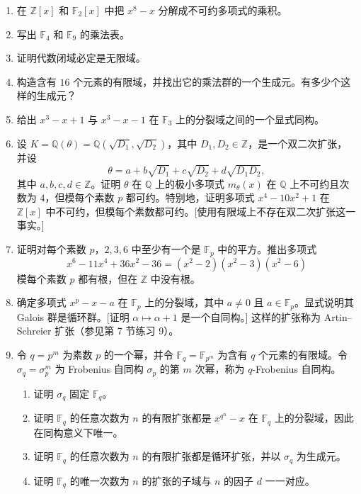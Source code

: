 \begin{enumerate}
\item 在 $\mathbb Z[x]$ 和 $\mathbb F_2[x]$ 中把 $x^8-x$ 分解成不可约多项式的乘积。

\item 写出 $\mathbb F_4$ 和 $\mathbb F_9$ 的乘法表。

\item 证明代数闭域必定是无限域。

\item 构造含有 $16$ 个元素的有限域，并找出它的乘法群的一个生成元。有多少个这样的生成元？

\item 给出 $x^3-x+1$ 与 $x^3-x-1$ 在 $\mathbb F_3$ 上的分裂域之间的一个显式同构。

\item 设 $K=\mathbb Q(\theta)=\mathbb Q(\sqrt{D_1},\sqrt{D_2})$，其中 $D_1,D_2\in\mathbb Z$，是一个双二次扩张，并设
\[
\theta=a+b\sqrt{D_1}+c\sqrt{D_2}+d\sqrt{D_1D_2},
\]
其中 $a,b,c,d\in\mathbb Z$。证明 $\theta$ 在 $\mathbb Q$ 上的极小多项式 $m_\theta(x)$ 在 $\mathbb Q$ 上不可约且次数为 $4$，但模每个素数 $p$ 都可约。特别地，证明多项式 $x^4-10x^2+1$ 在 $\mathbb Z[x]$ 中不可约，但模每个素数都可约。[使用有限域上不存在双二次扩张这一事实。]

\item 证明对每个素数 $p$，$2,3,6$ 中至少有一个是 $\mathbb F_p$ 中的平方。推出多项式
\[
x^6-11x^4+36x^2-36=(x^2-2)(x^2-3)(x^2-6)
\]
模每个素数 $p$ 都有根，但在 $\mathbb Z$ 中没有根。

\item 确定多项式 $x^p-x-a$ 在 $\mathbb F_p$ 上的分裂域，其中 $a\neq 0$ 且 $a\in\mathbb F_p$。显式说明其 Galois 群是循环群。[证明 $\alpha\mapsto \alpha+1$ 是一个自同构。] 这样的扩张称为 Artin--Schreier 扩张（参见第 7 节练习 9）。

\item 令 $q=p^m$ 为素数 $p$ 的一个幂，并令 $\mathbb F_q=\mathbb F_{p^m}$ 为含有 $q$ 个元素的有限域。令 $\sigma_q=\sigma_p^m$ 为 Frobenius 自同构 $\sigma_p$ 的第 $m$ 次幂，称为 $q$-Frobenius 自同构。
\begin{enumerate}[label=(\alph*)]
\item 证明 $\sigma_q$ 固定 $\mathbb F_q$。
\item 证明 $\mathbb F_q$ 的任意次数为 $n$ 的有限扩张都是 $x^{q^n}-x$ 在 $\mathbb F_q$ 上的分裂域，因此在同构意义下唯一。
\item 证明 $\mathbb F_q$ 的任意次数为 $n$ 的有限扩张都是循环扩张，并以 $\sigma_q$ 为生成元。
\item 证明 $\mathbb F_q$ 的唯一次数为 $n$ 的扩张的子域与 $n$ 的因子 $d$ 一一对应。
\end{enumerate}


\end{enumerate}
